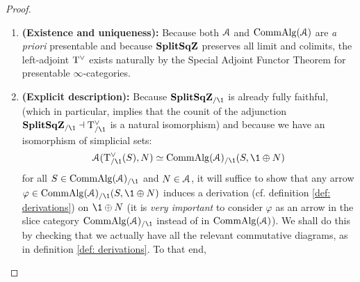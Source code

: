                         \begin{proof}
                            \noindent
                            \begin{enumerate}
                                \item \textbf{(Existence and uniqueness):} Because both $\mathcal{A}$ and $\mathrm{Comm}\mathrm{Alg}(\mathcal{A})$ are \textit{a priori} presentable and because $\mathbf{Split}\mathbf{Sq}\mathbf{Z}$ preserves all limit and colimits, the left-adjoint $\mathrm{T}^{\vee}$ exists naturally by the Special Adjoint Functor Theorem for presentable $\infty$-categories.
                                \item \textbf{(Explicit description):} Because $\Split\SqZ_{/\1}$ is already fully faithful, (which in particular, implies that the counit of the adjunction $\Split\SqZ_{/\1} \ladjoint \tangent^{\vee}_{/\1}$ is a natural isomorphism) and because we have an isomorphism of simplicial sets:
                                    $$\calA(\tangent^{\vee}_{/\1}(S), N) \cong \Comm\Alg(\calA)_{/\1}(S, \1 \oplus N)$$
                                for all $S \in \Comm\Alg(\calA)_{/\1}$ and $N \in \mathcal{A}$, it will suffice to show that any arrow $\varphi \in \Comm\Alg(\calA)_{/\1}(S, \1 \oplus N)$ induces a derivation (cf. definition \ref{def: derivations}) on $\1 \oplus N$ (it is \textit{very important} to consider $\varphi$ as an arrow in the slice category $\Comm\Alg(\calA)_{/\1}$ instead of in $\mathrm{Comm}\mathrm{Alg}(\mathcal{A})$). We shall do this by checking that we actually have all the relevant commutative diagrams, as in definition \ref{def: derivations}. To that end, 
                            \end{enumerate}
                        \end{proof}
